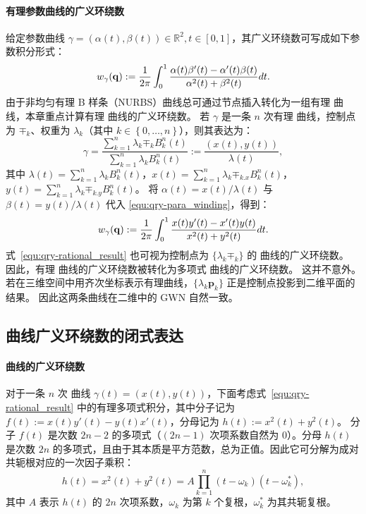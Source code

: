 \paragraph{有理参数曲线的广义环绕数}
给定参数曲线 $\gamma = (\alpha(t),\beta(t))\in \mathbb{R}^2, t \in [0,1]$，其广义环绕数可写成如下参数积分形式：
\begin{equation}\label{equ:qry-para_winding}
    w_\gamma(\mathbf{q}):=\frac{1}{2 \pi}\int_0^1 \frac{\alpha(t) \beta'(t) - \alpha'(t) \beta(t)}{\alpha^2(t)+\beta^2(t)} dt.
\end{equation}
%
由于非均匀有理 B 样条（NURBS）曲线总可通过节点插入转化为一组有理 \Bezier 曲线，本章重点计算有理 \Bezier 曲线的广义环绕数。
%
若 $\gamma$ 是一条 $n$ 次有理 \Bezier 曲线，控制点为 ${\mp}_k$、权重为 $\lambda_k$（其中 $k \in \left \{0,\dots,n\right\}$），则其表达为：
\begin{equation}
    \gamma = \frac{\sum_{k=1}^n \lambda_k \mp_k B_k^n(t)}{\sum_{k=1}^n \lambda_k B_k^n(t)}:=\frac{(x(t),y(t))}{\lambda(t)},
\end{equation}
其中 $\lambda(t)=\sum_{k=1}^n \lambda_k B_k^n(t)$，$x(t)=\sum_{k=1}^n \lambda_k \mp_{k.x} B_k^n(t)$，$y(t)=\sum_{k=1}^n \lambda_k \mp_{k.y} B_k^n(t)$。
将 $\alpha(t)=x(t)/\lambda(t)$ 与 $\beta(t)=y(t)/\lambda(t)$ 代入 \eqref{equ:qry-para_winding}，得到：
\begin{equation}\label{equ:qry-rational_result}
    w_{\gamma }(\mathbf{q}):=\frac{1}{2 \pi}\int_0^1 \frac{x(t)y'(t)-x'(t)y(t)}{x^2(t)+y^2(t)} dt.
\end{equation}
式~\eqref{equ:qry-rational_result} 也可视为控制点为 $\{\lambda_k \mp_k\}$ 的 \Bezier 曲线的广义环绕数。
因此，有理 \Bezier 曲线的广义环绕数被转化为多项式 \Bezier 曲线的广义环绕数。
这并不意外。
若在三维空间中用齐次坐标表示有理曲线，$\{\lambda_k \mathbf{p}_k\}$ 正是控制点投影到二维平面的结果。
因此这两条曲线在二维中的 GWN 自然一致。


\subsection{\Bezier 曲线广义环绕数的闭式表达}\label{sec:qry-general}
\paragraph{\Bezier 曲线的广义环绕数}
对于一条 $n$ 次 \Bezier 曲线 $\gamma(t)=(x(t),y(t))$，下面考虑式~\eqref{equ:qry-rational_result} 中的有理多项式积分，其中分子记为 $f(t):=x(t)y'(t)-y(t)x'(t)$，分母记为 $h(t):=x^2(t)+y^2(t)$。
分子 $f(t)$ 是次数 $2n-2$ 的多项式（$(2n-1)$ 次项系数自然为 0）。分母 $h(t)$ 是次数 $2n$ 的多项式，且由于其本质是平方范数，总为正值。因此它可分解为成对共轭根对应的一次因子乘积：
\begin{equation}
    h(t)=x^2(t)+y^2(t)=A \prod_{k=1}^n (t-\omega_k)(t-\omega_k^*),
\end{equation}
其中 $A$ 表示 $h(t)$ 的 $2n$ 次项系数，$\omega_k$ 为第 $k$ 个复根，$\omega_k^*$ 为其共轭复根。

